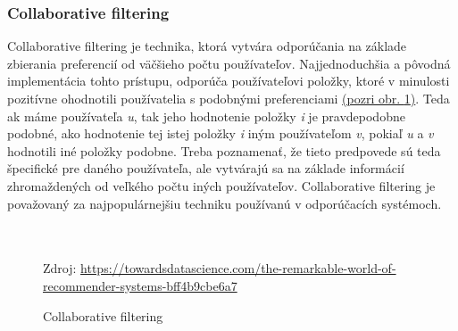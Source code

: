 \subsubsection{Collaborative filtering}
Collaborative filtering je technika, ktorá vytvára odporúčania na základe zbierania preferencií od väčšieho počtu používateľov. Najjednoduchšia a pôvodná implementácia tohto prístupu, odporúča používateľovi položky, ktoré v minulosti pozitívne ohodnotili používatelia s podobnými preferenciami \hyperref[collaborativeFiltering]{(pozri obr. \ref{collaborativeFiltering})}. Teda ak máme používateľa  \textit{u}, tak jeho hodnotenie položky \textit{i} je pravdepodobne podobné, ako hodnotenie tej istej položky \textit{i} iným používateľom \textit{v}, pokiaľ \textit{u} a \textit{v} hodnotili iné položky podobne. Treba poznamenať, že tieto predpovede sú teda špecifické pre daného používateľa, ale vytvárajú sa na základe informácií zhromaždených od veľkého počtu iných používateľov. Collaborative filtering je považovaný za najpopulárnejšiu techniku používanú v odporúčacích systémoch. \\\\\\


\begin{figure}[!htbp]
  \centering  
  \def\stackalignment{c}
           {\scriptsize%
            Zdroj: \url{https://towardsdatascience.com/the-remarkable-world-of-recommender-systems-bff4b9cbe6a7}}
  \caption{Collaborative filtering}
  
  \label{collaborativeFiltering}
\end{figure}

